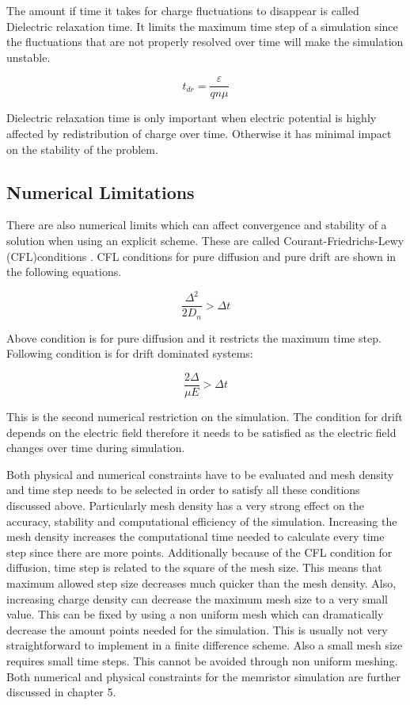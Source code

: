 \begin{doublespace}
The amount if time it takes for charge fluctuations to disappear is called Dielectric relaxation time. It limits the maximum time step of a simulation since the fluctuations that are not properly resolved over time will make the simulation unstable.

\begin{equation}
t_{dr}=\frac{\varepsilon}{q n \mu}
\label{tdr}
\end{equation}

Dielectric relaxation time is only important when electric potential is highly affected by redistribution of charge over time. Otherwise it has minimal impact on the stability of the problem.
\subsection{Numerical Limitations}

There are also numerical limits which can affect convergence and stability of a solution when using an explicit scheme. These are called Courant-Friedrichs-Lewy (CFL)conditions \cite{NumModel}. CFL conditions for pure diffusion and pure drift are shown in the following equations.

\begin{equation}
\frac{\Delta ^2}{2 D_n}>\Delta t
\label{CFL_Diff}
\end{equation}

Above condition is for pure diffusion and it restricts the maximum time step. Following condition is for drift dominated systems:

\begin{equation}
\frac{2 \Delta }{\mu E}>\Delta t
\label{CFL_Drift}
\end{equation}

This is the second numerical restriction on the simulation. The condition for drift depends on the electric field therefore it needs to be satisfied as the electric field changes over time during simulation.

Both physical and numerical constraints have to be evaluated and mesh density and time step needs to be selected in order to satisfy all these conditions discussed above. Particularly mesh density has a very strong effect on the accuracy, stability and computational efficiency of the simulation. Increasing the mesh density increases the computational time needed to calculate every time step since there are more points. Additionally because of the CFL condition for diffusion, time step is related to the square of the mesh size. This means that maximum allowed step size decreases much quicker than the mesh density. Also, increasing charge density can decrease the maximum mesh size to a very small value. This can be fixed by using a non uniform mesh which can dramatically decrease the amount points needed for the simulation. This is usually not very straightforward to implement in a finite difference scheme. Also a small mesh size requires small time steps. This cannot be avoided through non uniform meshing. Both numerical and physical constraints for the memristor simulation are further discussed in chapter 5.


\end{doublespace}
